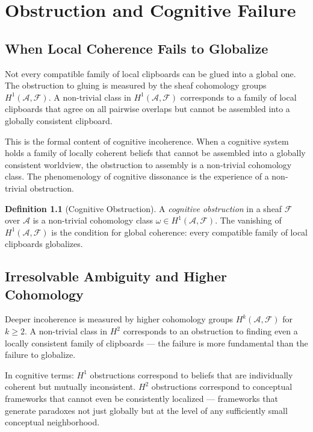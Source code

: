 \documentclass[12pt,oneside]{book}
\theoremstyle{plain}
\theoremstyle{definition}
\newtheorem{definition}[theorem]{Definition}
\theoremstyle{plain}
\newcommand{\cA}{\mathcal{A}}
\begin{document}
\chapter{Obstruction and Cognitive Failure}
\label{ch:sheaf_obstructions}

\section{When Local Coherence Fails to Globalize}

Not every compatible family of local clipboards can be glued into a global one. The obstruction to gluing is measured by the sheaf cohomology groups $H^1(\cA, \mathcal{F})$. A non-trivial class in $H^1(\cA, \mathcal{F})$ corresponds to a family of local clipboards that agree on all pairwise overlaps but cannot be assembled into a globally consistent clipboard.

This is the formal content of cognitive incoherence. When a cognitive system holds a family of locally coherent beliefs that cannot be assembled into a globally consistent worldview, the obstruction to assembly is a non-trivial cohomology class. The phenomenology of cognitive dissonance is the experience of a non-trivial obstruction.

\begin{definition}[Cognitive Obstruction]
A \emph{cognitive obstruction} in a sheaf $\mathcal{F}$ over $\cA$ is a non-trivial cohomology class $\omega \in H^1(\cA, \mathcal{F})$. The vanishing of $H^1(\cA, \mathcal{F})$ is the condition for global coherence: every compatible family of local clipboards globalizes.
\end{definition}

\section{Irresolvable Ambiguity and Higher Cohomology}

Deeper incoherence is measured by higher cohomology groups $H^k(\cA, \mathcal{F})$ for $k \geq 2$. A non-trivial class in $H^2$ corresponds to an obstruction to finding even a locally consistent family of clipboards — the failure is more fundamental than the failure to globalize.

In cognitive terms: $H^1$ obstructions correspond to beliefs that are individually coherent but mutually inconsistent. $H^2$ obstructions correspond to conceptual frameworks that cannot even be consistently localized — frameworks that generate paradoxes not just globally but at the level of any sufficiently small conceptual neighborhood.
\end{document}
